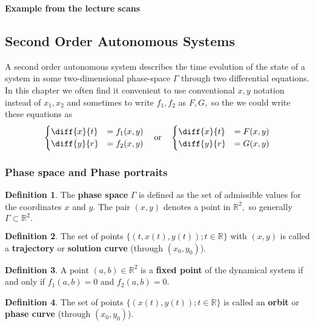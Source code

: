 \documentclass[12pt, a4paper]{article}
\newcommand{\bb}[1]{\mathbb{#1}}
\theoremstyle{definition}
\newtheorem{definition}{Definition}[section]
\theoremstyle{plain}
\begin{document}
\textbf{Example from the lecture scans}



\subsection{Second Order Autonomous Systems}

A second order autonomous system describes the time evolution of the state of a system in some two-dimensional phase-space $\Gamma$ through two differential equations. \\ In this chapter we often find it convenient to use conventional $x,y$ notation instead of $x_1,x_2$ and sometimes to write $f_1,f_2$ as $F,G,$ so the we could write these equations as 
$$\begin{aligned}
\begin{cases}
\diff{x}{t}&=f_1(x,y) \\
\diff{y}{r}&=f_2(x,y)
\end{cases} \quad \text{or} \quad 
\begin{cases}
\diff{x}{t}&=F(x,y) \\
\diff{y}{r}&=G(x,y)
\end{cases}
\end{aligned}$$


\subsubsection{Phase space and Phase portraits}

\begin{definition}
The \textbf{phase space} $\Gamma$ is defined as the set of admissible values for the coordinates $x$ and $y.$ The pair $(x, y)$ denotes a point in $\bb{R}^2,$ so generally $\Gamma \subset \bb{R}^2.$
\end{definition}

\begin{definition}
The set of points $\{(t,x(t),y(t));t \in \bb{R}\}$ with $(x,y)$ is called a \textbf{trajectory} or \textbf{solution curve} (through $(x_0, y_0)$).
\end{definition}

\begin{definition}
A point $(a, b) \in \bb{R}^2$ is a \textbf{fixed point} of the dynamical system if and only if $f_1(a, b) = 0$ and $f_2(a, b) = 0.$
\end{definition}

\begin{definition}
The set of points $\{(x(t),y(t));t \in \bb{R}\}$ is called an \textbf{orbit} or \textbf{phase curve} (through $(x_0, y_0)$).
\end{definition}
\end{document}
